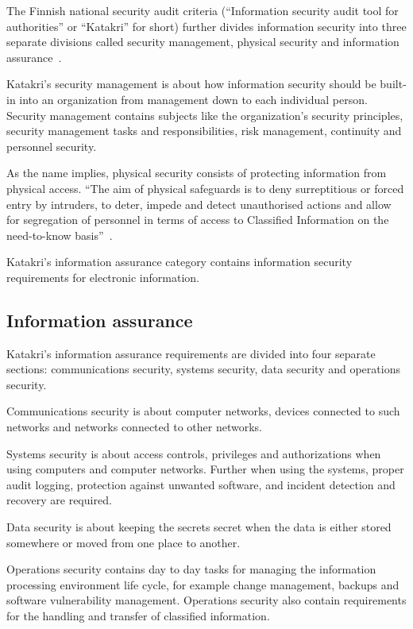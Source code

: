 The Finnish national security audit criteria (``Information security
audit tool for authorities'' or ``Katakri'' for short) further divides
information security into three separate divisions called security
management, physical security and information
assurance~\cite{katakri}.

Katakri's security management is about how information security should
be built-in into an organization from management down to each
individual person. Security management contains subjects like the
organization's security principles, security management tasks and
responsibilities, risk management, continuity and personnel security.

As the name implies, physical security consists of protecting
information from physical access. ``The aim of physical safeguards is
to deny surreptitious or forced entry by intruders, to deter, impede
and detect unauthorised actions and allow for segregation of personnel
in terms of access to Classified Information on the need-to-know
basis''~\cite{katakri}.

Katakri's information assurance category contains information security
requirements for electronic information.


\subsection{Information assurance}

Katakri's information assurance requirements are divided into four
separate sections: communications security, systems security, data
security and operations security.

Communications security is about computer networks, devices connected
to such networks and networks connected to other networks.

Systems security is about access controls, privileges and
authorizations when using computers and computer networks. Further
when using the systems, proper audit logging, protection against
unwanted software, and incident detection and recovery are required.

Data security is about keeping the secrets secret when the data is
either stored somewhere or moved from one place to another.

Operations security contains day to day tasks for managing the
information processing environment life cycle, for example change
management, backups and software vulnerability management. Operations
security also contain requirements for the handling and transfer of
classified information.


